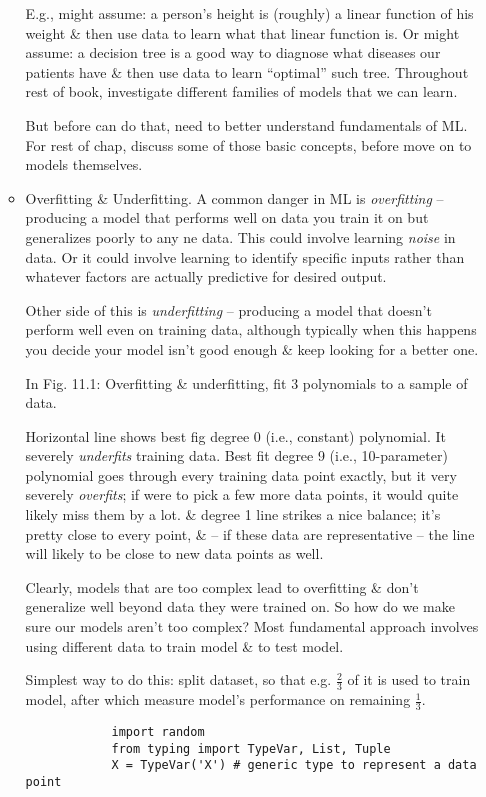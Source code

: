 \documentclass{article}
\begin{document}
\begin{itemize}
\begin{itemize}
		E.g., might assume: a person's height is (roughly) a linear function of his weight \& then use data to learn what that linear function is. Or might assume: a decision tree is a good way to diagnose what diseases our patients have \& then use data to learn ``optimal'' such tree. Throughout rest of book, investigate different families of models that we can learn.
		
		But before can do that, need to better understand fundamentals of ML. For rest of chap, discuss some of those basic concepts, before move on to models themselves.
		\item {\sf Overfitting \& Underfitting.} A common danger in ML is {\it overfitting} -- producing a model that performs well on data you train it on but generalizes poorly to any ne data. This could involve learning {\it noise} in data. Or it could involve learning to identify specific inputs rather than whatever factors are actually predictive for desired output.
		
		Other side of this is {\it underfitting} -- producing a model that doesn't perform well even on training data, although typically when this happens you decide your model isn't good enough \& keep looking for a better one.
		
		In {\sf Fig. 11.1: Overfitting \& underfitting}, fit 3 polynomials to a sample of data.
		
		Horizontal line shows best fig degree 0 (i.e., constant) polynomial. It severely {\it underfits} training data. Best fit degree 9 (i.e., 10-parameter) polynomial goes through every training data point exactly, but it very severely {\it overfits}; if were to pick a few more data points, it would quite likely miss them by a lot. \& degree 1 line strikes a nice balance; it's pretty close to every point, \& -- if these data are representative -- the line will likely to be close to new data points as well.
		
		Clearly, models that are too complex lead to overfitting \& don't generalize well beyond data they were trained on. So how do we make sure our models aren't too complex? Most fundamental approach involves using different data to train model \& to test model.
		
		Simplest way to do this: split dataset, so that e.g. $\frac{2}{3}$ of it is used to train model, after which measure model's performance on remaining $\frac{1}{3}$.
		\begin{verbatim}
			import random
			from typing import TypeVar, List, Tuple
			X = TypeVar('X') # generic type to represent a data point
			

\end{verbatim}
\end{itemize}
\end{itemize}
\end{document}
